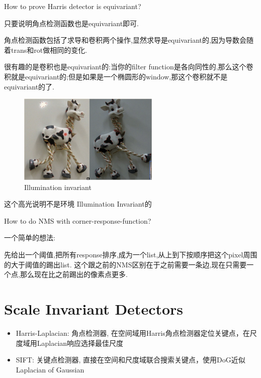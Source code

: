 \begin{problem}
    How to prove Harris detector is equivariant?
\end{problem}


只要说明角点检测函数也是equivariant即可.

角点检测函数包括了求导和卷积两个操作,显然求导是equivariant的,因为导数会随着trans和rot做相同的变化.

很有趣的是卷积也是equivariant的:当你的filter function是各向同性的,那么这个卷积就是equivariant的;但是如果是一个椭圆形的window,那这个卷积就不是equivariant的了.

\begin{figure}[htbp]
    \centering
    \includegraphics[width=0.6\textwidth]{figures/light_invariant.png}
    \caption{Illumination invariant}
\end{figure}
\begin{remark}
    这个高光说明不是环境 Illumination Invariant的
\end{remark}


\begin{problem}
    How to do NMS with corner-response-function?
\end{problem}


一个简单的想法:

先给出一个阈值,把所有response排序,成为一个list,从上到下按顺序把这个pixel周围的大于阈值的踢出list.
这个跟之前的NMS区别在于之前需要一条边,现在只需要一个点,那么现在比之前踢出的像素点更多.

\section{Scale Invariant Detectors}
\begin{itemize}
    \item Harris-Laplacian: 角点检测器, 在空间域用Harris角点检测器定位关键点，在尺度域用Laplacian响应选择最佳尺度
    \item SIFT: 关键点检测器, 直接在空间和尺度域联合搜索关键点，使用DoG近似Laplacian of Gaussian
\end{itemize}
